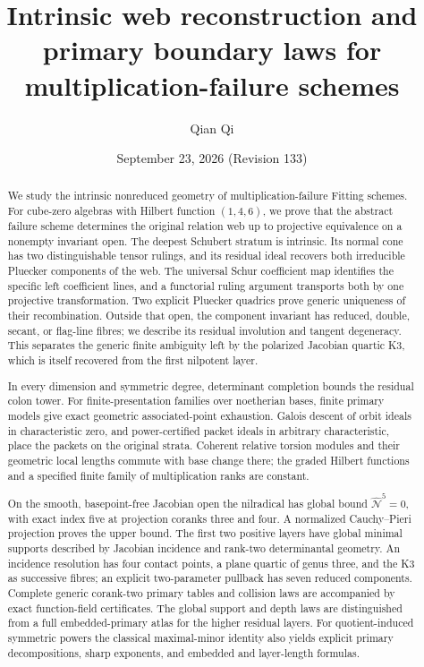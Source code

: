 \title[Web reconstruction and primary boundary laws]{Intrinsic web reconstruction and primary boundary laws for multiplication-failure schemes}
\author{Qian Qi}
\date{September 23, 2026 \quad (Revision 133)}
\begin{abstract}
We study the intrinsic nonreduced geometry of multiplication-failure
Fitting schemes.  For cube-zero algebras with Hilbert function
\((1,4,6)\), we prove that the abstract failure scheme determines
the original relation web up to projective equivalence on a nonempty
invariant open.  The deepest Schubert stratum is intrinsic.  Its
normal cone has two distinguishable tensor rulings, and its residual
ideal recovers both irreducible Pluecker components of the web.
The universal Schur coefficient map identifies the specific left
coefficient lines, and a functorial ruling argument transports both by
one projective transformation.  Two explicit Pluecker quadrics prove
generic uniqueness of their recombination.  Outside that open, the
component invariant has reduced, double, secant, or flag-line fibres;
we describe its residual involution and tangent degeneracy.  This separates the generic finite ambiguity left by
the polarized Jacobian quartic K3, which is itself recovered from
the first nilpotent layer.

In every dimension and symmetric degree, determinant completion bounds
the residual colon tower.  For finite-presentation families over
noetherian bases, finite primary models give exact geometric
associated-point exhaustion.  Galois descent of orbit ideals in
characteristic zero, and power-certified packet ideals in arbitrary
characteristic, place the packets on the original strata.  Coherent
relative torsion modules and their geometric local lengths commute
with base change there; the graded Hilbert functions and a specified
finite family of multiplication ranks are constant.

On the smooth, basepoint-free Jacobian open the nilradical has global
bound \(\widehat{\mathcal N}^{5}=0\), with exact index five at
projection coranks three and four.  A normalized Cauchy--Pieri
projection proves the upper bound.  The first two positive layers
have global minimal supports described by Jacobian incidence and
rank-two determinantal geometry.  An incidence resolution has four
contact points, a plane quartic of genus three, and the K3 as
successive fibres; an explicit two-parameter pullback has seven
reduced components.  Complete generic corank-two primary tables and
collision laws are accompanied by exact function-field certificates.
The global support and depth laws are distinguished from a full
embedded-primary atlas for the higher residual layers.
For quotient-induced symmetric powers the classical maximal-minor
identity also yields explicit primary decompositions, sharp exponents,
and embedded and layer-length formulas.
\end{abstract}
\maketitle
